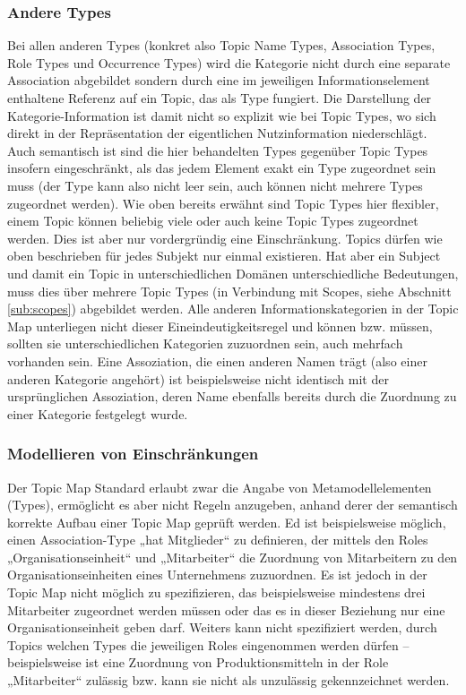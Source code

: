 \subsubsection{Andere Types}

Bei allen anderen Types (konkret also Topic Name Types, Association Types, Role Types und Occurrence Types) wird die Kategorie nicht durch eine separate Association abgebildet sondern durch eine im jeweiligen Informationselement enthaltene Referenz auf ein Topic, das als Type fungiert. Die Darstellung der Kategorie-Information ist damit nicht so explizit wie bei Topic Types, wo sich direkt in der Repräsentation der eigentlichen Nutzinformation niederschlägt. Auch semantisch ist sind die hier behandelten Types gegenüber Topic Types insofern eingeschränkt, als das jedem Element exakt ein Type zugeordnet sein muss (der Type kann also nicht leer sein, auch können nicht mehrere Types zugeordnet werden). Wie oben bereits erwähnt sind Topic Types hier flexibler, einem Topic können beliebig viele oder auch keine Topic Types zugeordnet werden. Dies ist aber nur vordergründig eine Einschränkung. Topics dürfen wie oben beschrieben für jedes Subjekt nur einmal existieren. Hat aber ein Subject und damit ein Topic in unterschiedlichen Domänen unterschiedliche Bedeutungen, muss dies über mehrere Topic Types (in Verbindung mit Scopes, siehe Abschnitt \ref{sub:scopes}) abgebildet werden. Alle anderen Informationskategorien in der Topic Map unterliegen nicht dieser Eineindeutigkeitsregel und können bzw. müssen, sollten sie unterschiedlichen Kategorien zuzuordnen sein, auch mehrfach vorhanden sein. Eine Assoziation, die einen anderen Namen trägt (also einer anderen Kategorie angehört) ist beispielsweise nicht identisch mit der ursprünglichen Assoziation, deren Name ebenfalls bereits durch die Zuordnung zu einer Kategorie festgelegt wurde. 

\subsubsection{Modellieren von Einschränkungen}

Der Topic Map Standard erlaubt zwar die Angabe von Metamodellelementen (Types), ermöglicht es aber nicht Regeln anzugeben, anhand derer der semantisch korrekte Aufbau einer Topic Map geprüft werden. Ed ist beispielsweise möglich, einen Association-Type „hat Mitglieder“ zu definieren, der mittels den Roles „Organisationseinheit“ und „Mitarbeiter“ die Zuordnung von Mitarbeitern zu den Organisationseinheiten eines Unternehmens zuzuordnen. Es ist jedoch in der Topic Map nicht möglich zu spezifizieren, das beispielsweise mindestens drei Mitarbeiter zugeordnet werden müssen oder das es in dieser Beziehung nur eine Organisationseinheit geben darf. Weiters kann nicht spezifiziert werden, durch Topics welchen Types die jeweiligen Roles eingenommen werden dürfen -- beispielsweise ist eine Zuordnung von Produktionsmitteln in der Role „Mitarbeiter“ zulässig bzw. kann sie nicht als unzulässig gekennzeichnet werden.

